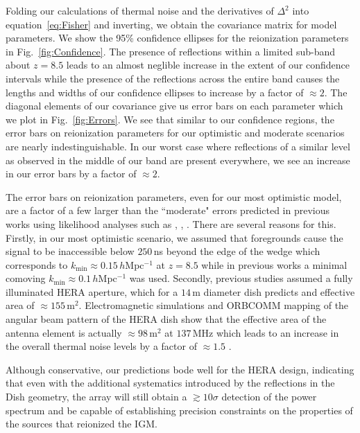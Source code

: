 \documentclass[twocolumn]{emulateapj}
\begin{document}
Folding our calculations of thermal noise and the derivatives of $\Delta^2$ into equation~\ref{eq:Fisher} and inverting, we obtain the covariance matrix for model parameters. We show the 95\% confidence ellipses for the reionization parameters in Fig.~\ref{fig:Confidence}. The presence of reflections within a limited sub-band about $z=8.5$ leads to an almost neglible increase in the extent of our confidence intervals while the presence of the reflections across the entire band causes the lengths and widths of our confidence ellipses to increase by a factor of $\approx 2$. The diagonal elements of our covariance give us error bars on each parameter which we plot in Fig.~\ref{fig:Errors}. We see that similar to our confidence regions, the error bars on reionization parameters for our optimistic and moderate scenarios are nearly indestinguishable. In our worst case where reflections of a similar level as observed in the middle of our band are present everywhere, we see an increase in our error bars by a factor of $\approx 2$. 

The error bars on reionization parameters, even for our most optimistic model, are a factor of a few larger than the ``moderate" errors predicted in previous works using likelihood analyses such as \citet{Pober:2014}, \citet{Greig:2015,Greig:2015b,Greig:2015c}  \citet{EwallWice:2015b}, \citet{Liu:2015a,Liu:2015b}. There are several reasons for this. Firstly, in our most optimistic scenario, we assumed that foregrounds cause the signal to be inaccessible below $250$\,ns beyond the edge of the wedge which corresponds to $k_\text{min} \approx 0.15$\,$h$Mpc$^{-1}$ at $z=8.5$ while in previous works a minimal comoving $k_\text{min} \approx 0.1$\,$h$Mpc$^{-1}$ was used. Secondly, previous studies assumed a fully illuminated HERA aperture, which for a $14$\,m diameter dish predicts and effective area of $\approx155$\,m$^2$. Electromagnetic simulations and ORBCOMM mapping of the angular beam pattern of the HERA dish show that the effective area of the antenna element is actually $\approx 98$\,m$^2$ at $137$\,MHz which leads to an increase in the overall thermal noise levels by a factor of $\approx 1.5$ \citep{Neben:2016}. 

Although conservative, our predictions bode well for the HERA design, indicating that even with the additional systematics introduced by the reflections in the Dish geometry, the array will still obtain a $\gtrsim 10 \sigma$ detection of the power spectrum and be capable of establishing precision constraints on the properties of the sources that reionized the IGM. 
\end{document}
